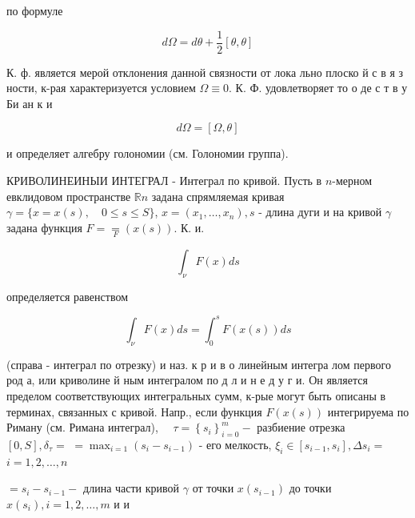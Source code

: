 \documentclass[10pt]{article}
\begin{document}
по формуле



\[

d \Omega=d \theta+\frac{1}{2}[\theta, \theta]

\]



К. ф. является мерой отклонения данной связности от лока льно плоско й с в я з ности, к-рая характеризуется условием $\Omega \equiv 0$. К. Ф. удовлетворяет то о де с т в у Би ан к и



\[

d \Omega=[\Omega, \theta]

\]



и определяет алгебру голономии (см. Голономии группа).



КРИВОЛИНЕИНЫИ ИНТЕГРАЛ - Интеграл по кривой. Пусть в $n$-мерном евклидовом пространстве $\mathbb{R} n$ задана спрямляемая кривая $\gamma=\{x=x(s), \quad 0 \leqslant s \leqslant S\}$, $x=\left(x_{1}, \ldots, x_{n}\right), s$ - длина дуги и на кривой $\gamma$ задана функция $F=\underset{F}{=}(x(s))$. К. и.



\[

\int_{\nu} F(x) d s

\]



определяется равенством



\[

\int_{\nu} F(x) d s=\int_{0}^{s} F(x(s)) d s

\]



(справа - интеграл по отрезку) и наз. к р и в о линейным интегра лом первого род а, или криволине й ным интегралом по д л и н е д у г и. Он является пределом соответствующих интегральных сумм, к-рые могут быть описаны в терминах, связанных с кривой. Напр., если функция $F(x(s))$ интегрируема по Риману (см. Римана интеграл), $\quad \tau=\left\{s_{i}\right\}_{i=0}^{m}-$ разбиение отрезка $[0, S], \delta_{\tau}=$ $=\max _{i=1}\left(s_{i}-s_{i-1}\right)$ - его мелкость, $\xi_{i} \in\left[s_{i-1}, s_{i}\right], \Delta s_{i}=$ $i=1,2, \ldots, n$

$=s_{i}-s_{i-1}-$ длина части кривой $\gamma$ от точки $x\left(s_{i-1}\right)$ до точки $x\left(s_{i}\right), i=1,2, \ldots, m$ и и
\end{document}
